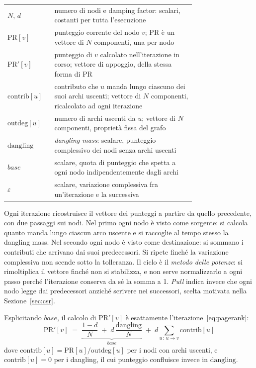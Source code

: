 \documentclass[11pt,a4paper]{article}
\newcommand{\stacco}{\par\medskip\noindent}
\begin{document}
\begin{center}
\begin{tabular}{@{}l p{0.75\linewidth}@{}}
\toprule
$N$, $d$ & numero di nodi e damping factor: scalari, costanti per tutta l'esecuzione \\
$\mathrm{PR}[v]$ & punteggio corrente del nodo $v$; $\mathrm{PR}$ è un vettore di $N$ componenti, una per nodo \\
$\mathrm{PR}'[v]$ & punteggio di $v$ calcolato nell'iterazione in corso; vettore di appoggio, della stessa forma di $\mathrm{PR}$ \\
$\mathrm{contrib}[u]$ & contributo che $u$ manda lungo ciascuno dei suoi archi uscenti; vettore di $N$ componenti, ricalcolato ad ogni iterazione \\
$\mathrm{outdeg}[u]$ & numero di archi uscenti da $u$; vettore di $N$ componenti, proprietà fissa del grafo \\
$\mathrm{dangling}$ & \emph{dangling mass}: scalare, punteggio complessivo dei nodi senza archi uscenti \\
$\mathit{base}$ & scalare, quota di punteggio che spetta a ogni nodo indipendentemente dagli archi \\
$\varepsilon$ & scalare, variazione complessiva fra un'iterazione e la successiva \\
\bottomrule
\end{tabular}
\end{center}

\stacco
Ogni iterazione ricostruisce il vettore dei punteggi a partire da quello
precedente, con due passaggi sui nodi. Nel primo ogni nodo è visto come
sorgente: si calcola quanto manda lungo ciascun arco uscente e si raccoglie
al tempo stesso la dangling mass. Nel secondo ogni nodo è visto come
destinazione: si sommano i contributi che arrivano dai suoi predecessori. Si
ripete finché la variazione complessiva non scende sotto la tolleranza. Il ciclo è il \emph{metodo delle potenze}: si rimoltiplica il vettore
finché non si stabilizza, e non serve normalizzarlo a ogni passo perché
l'iterazione conserva da sé la somma a 1. \emph{Pull} indica invece che ogni
nodo legge dai predecessori anziché scrivere nei successori, scelta motivata
nella Sezione~\ref{sec:csr}.

\stacco
Esplicitando $\mathit{base}$, il calcolo di $\mathrm{PR}'[v]$ è esattamente
l'iterazione~\eqref{eq:pagerank}:
\[
\mathrm{PR}'[v] \;=\;
\underbrace{\frac{1-d}{N} \;+\; d\,\frac{\mathrm{dangling}}{N}}_{\mathit{base}}
\;+\; d \sum_{u \,:\, u \to v} \mathrm{contrib}[u]
\]
dove $\mathrm{contrib}[u] = \mathrm{PR}[u]/\mathrm{outdeg}[u]$ per i nodi con archi
uscenti, e $\mathrm{contrib}[u] = 0$ per i dangling, il cui punteggio confluisce invece in
$\mathrm{dangling}$.
\end{document}
